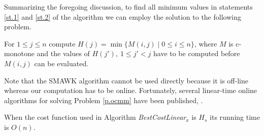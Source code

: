 Summarizing the foregoing discussion, to find all minimum values in statements \ref{st.1} and \ref{st.2} of the algorithm we can employ the solution to the following problem.
\begin{problem}\label{p.ocmm}
		For $1\leq j \leq n$ compute $H(j)=\min \{M(i,j) \mid 0\leq i \leq n\}$, where 
		$M$ is c-monotone and
	the values of $H(j'),\ 1\leq j'<j$ have to be computed before $M(i,j)$ can be evaluated.
\end{problem}
Note that the SMAWK algorithm cannot
be used directly because it is off-line whereas our computation has to be online.
Fortunately, several linear-time online algorithms for solving Problem \ref{p.ocmm} have been published, 
\cite{klawe89,larmore91,galil92,barnoy09}.

\begin{theorem}\label{t.linear-s}
	When the cost function used in Algorithm \emph{BestCostLinear}$_x$ is $H_s$ its running time is $O(n)$.
\end{theorem}

\
